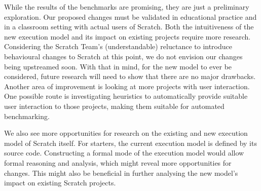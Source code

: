 \documentclass[../main]{subfiles}
\begin{document}
While the results of the benchmarks are promising, they are just a preliminary exploration.
Our proposed changes must be validated in educational practice and in a classroom setting with actual users of Scratch.
Both the intuitiveness of the new execution model and its impact on existing projects require more research.
Considering the Scratch Team's (understandable) reluctance to introduce behavioural changes to Scratch at this point, we do not envision our changes being upstreamed soon.
With that in mind, for the new model to ever be considered, future research will need to show that there are no major drawbacks.
Another area of improvement is looking at more projects with user interaction.
One possible route is investigating heuristics to automatically provide suitable user interaction to those projects, making them suitable for automated benchmarking.

We also see more opportunities for research on the existing and new execution model of Scratch itself.
For starters, the current execution model is defined by its source code.
Constructing a formal mode of the execution model would allow formal reasoning and analysis, which might reveal more opportunities for changes.
This might also be beneficial in further analysing the new model's impact on existing Scratch projects.
\end{document}
